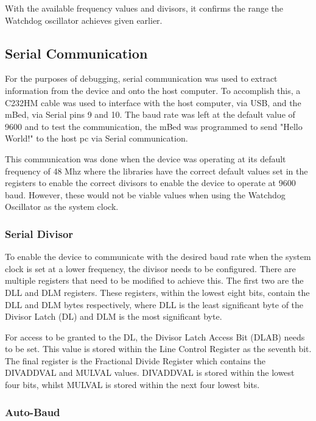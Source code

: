 With the available frequency values and divisors, it confirms the range the Watchdog oscillator achieves given earlier.

\subsection{Serial Communication}

For the purposes of debugging, serial communication was used to extract information from the device and onto the host computer. To accomplish this, a C232HM cable \cite{c232hm_datasheet} was used to interface with the host computer, via USB, and the mBed, via Serial pins 9 and 10. The baud rate was left at the default value of 9600 and to test the communication, the mBed was programmed to send "Hello World!" to the host pc via Serial communication.

This communication was done when the device was operating at its default frequency of 48 Mhz where the libraries have the correct default values set in the registers to enable the correct divisors to enable the device to operate at 9600 baud. However, these would not be viable values when using the Watchdog Oscillator as the system clock.

\subsubsection{Serial Divisor}

To enable the device to communicate with the desired baud rate when the system clock is set at a lower frequency, the divisor needs to be configured. There are multiple registers that need to be modified to achieve this. The first two are the DLL and DLM registers. These registers, within the lowest eight bits, contain the DLL and DLM bytes respectively, where DLL is the least significant byte of the Divisor Latch (DL) and DLM is the most significant byte.

For access to be granted to the DL, the Divisor Latch Access Bit (DLAB) needs to be set. This value is stored within the Line Control Register as the seventh bit. The final register is the Fractional Divide Register which contains the DIVADDVAL and MULVAL values. DIVADDVAL is stored within the lowest four bits, whilst MULVAL is stored within the next four lowest bits. 

\subsubsection{Auto-Baud}

